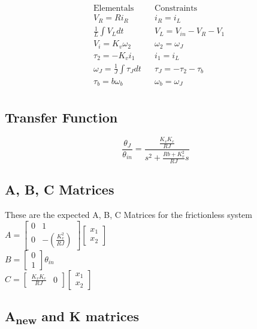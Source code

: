 \documentclass{homework}
\begin{document}
\begin{align*}
	& \text{Elementals} &  & \text{Constraints}	\\
	& V_R = Ri_R         &  & i_R = i_L        \\
	& \frac{1}{L}\int{}V_Ldt         &  & V_L = V_{in} - V_R - V_1        \\
	& V_i  = K_v\omega_2       &  & \omega_2 = \omega_J        \\
	& \tau_2 = -K_vi_1         &  & i_1 = i_L        \\
	& \omega_J = \frac{1}{J}\int{}\tau_Jdt         &  & \tau_J = -\tau_2 - \tau_b        \\
	& \tau_b = b\omega_b         &  & \omega_b = \omega_J        \\
\end{align*}

\subsection*{Transfer Function}

\[\frac{\theta_J}{\theta_{in}} = \frac{\frac{K_vK_c}{RJ}}{s^2 + \frac{Rb + K_v^2}{RJ}s}\]

\subsection*{A, B, C Matrices}

These are the expected A, B, C Matrices for the frictionless system\\
$A = \begin{bmatrix}
0 & 1\\
0 & -(\frac{K_v^2}{RJ})
\end{bmatrix}\begin{bmatrix}
x_1\\
x_2
\end{bmatrix}$
\[\]
$B = \begin{bmatrix}
0\\
1
\end{bmatrix}\theta_{in}$
\[\]
$C = \begin{bmatrix}
\frac{K_vK_c}{RJ} & 0
\end{bmatrix}\begin{bmatrix}
x_1\\
x_2\end{bmatrix}$

\subsection*{A\textsubscript{new} and K matrices}
\end{document}
